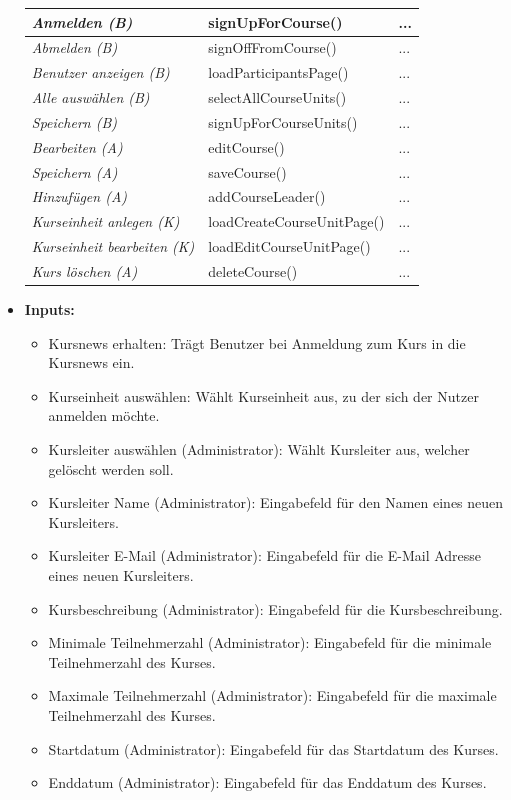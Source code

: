 \begin{itemize}
\begin{center}
\begin{longtable}{|p{4cm} |p{6cm} | p{4cm}|}
					\textit{Anmelden (B)} & signUpForCourse() & ... \\ \hline
					\textit{Abmelden (B)} &  signOffFromCourse() & ... \\ \hline
					\textit{Benutzer anzeigen (B)} & loadParticipantsPage() & ... \\ \hline
					\textit{Alle auswählen (B)} & selectAllCourseUnits() & ... \\ \hline
					\textit{Speichern (B)} & signUpForCourseUnits() & ... \\ \hline
					\textit{Bearbeiten (A)} & editCourse() & ... \\ \hline
					\textit{Speichern (A)} & saveCourse() & ... \\ \hline
					\textit{Hinzufügen (A)} & addCourseLeader() & ... \\ \hline
					\textit{Kurseinheit anlegen (K)} & loadCreateCourseUnitPage() & ... \\ \hline
					\textit{Kurseinheit bearbeiten (K)} & loadEditCourseUnitPage() & ... \\ \hline
					\textit{Kurs löschen (A)} & deleteCourse() & ... \\ \hline
				\end{longtable}
			\end{center}
			\item \textbf{Inputs:}
			\begin{itemize}
				\item Kursnews erhalten: Trägt Benutzer bei Anmeldung zum Kurs in die Kursnews ein.
				\item Kurseinheit auswählen: Wählt Kurseinheit aus, zu der sich der Nutzer anmelden möchte.
				\item Kursleiter auswählen (Administrator): Wählt Kursleiter aus, welcher gelöscht werden soll.
				\item Kursleiter Name (Administrator): Eingabefeld für den Namen eines neuen Kursleiters.
				\item Kursleiter E-Mail (Administrator): Eingabefeld für die E-Mail Adresse eines neuen Kursleiters.
				\item Kursbeschreibung (Administrator): Eingabefeld für die Kursbeschreibung.
				\item Minimale Teilnehmerzahl (Administrator): Eingabefeld für die minimale Teilnehmerzahl des Kurses.
				\item Maximale Teilnehmerzahl (Administrator): Eingabefeld für die maximale Teilnehmerzahl des Kurses.
				\item Startdatum (Administrator): Eingabefeld für das Startdatum des Kurses.
				\item Enddatum (Administrator): Eingabefeld für das Enddatum des Kurses.
			\end{itemize}
				\begin{center}
					\begin{longtable}{|p{3cm} |p{4cm} | p{4cm}|p{3cm} |p{2cm}|}
						

\end{longtable}
\end{center}
\end{itemize}
